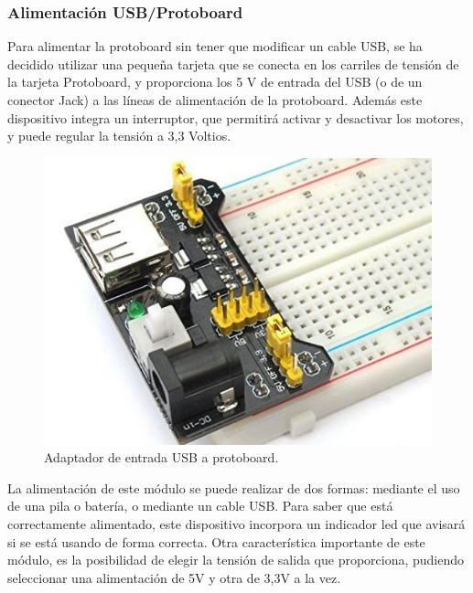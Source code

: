 \subsubsection{ Alimentación USB/Protoboard}

Para alimentar la protoboard sin tener que modificar un cable USB, se ha decidido utilizar una pequeña tarjeta que se conecta en los carriles de tensión de la tarjeta Protoboard, y
proporciona los 5 V de entrada del USB (o de un conector Jack) a las líneas de alimentación de la protoboard. Además este dispositivo integra un interruptor, que permitirá activar y
desactivar los motores, y puede regular la tensión a 3,3 Voltios.\\

\begin{figure}[H]
  \begin{center}
    \includegraphics[scale=0.3]{imagenes/alimentador_usb_protoboard.jpg}
  \end{center}
  \caption{Adaptador de entrada USB a protoboard.}
  \label{figura:alimentador_usb_protoboard}
\end{figure}

La alimentación de este módulo se puede realizar de dos formas: mediante el uso de una pila o batería, o mediante un cable USB. Para saber que está correctamente alimentado, este 
dispositivo incorpora un indicador led que avisará si se está usando de forma correcta. Otra característica importante de este módulo, es la posibilidad de elegir la tensión de
salida que proporciona, pudiendo seleccionar una alimentación de 5V y otra de 3,3V a la vez.\\

